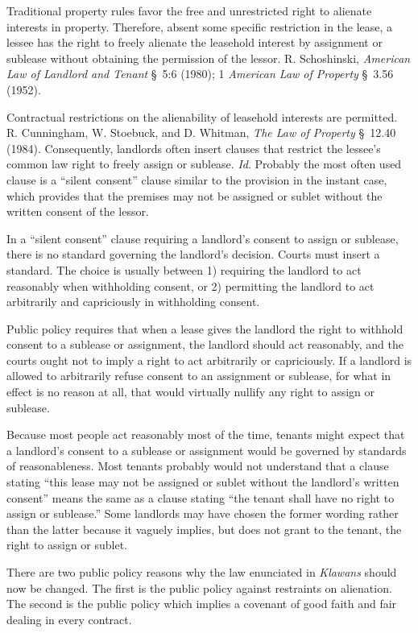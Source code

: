 Traditional property rules favor the free and unrestricted right to alienate
interests in property. Therefore, absent some specific restriction in the
lease, a lessee has the right to freely alienate the leasehold interest by
assignment or sublease without obtaining the permission of the lessor. R.
Schoshinski, \textit{American Law of Landlord and Tenant} \S~5:6 (1980); 1
\textit{American Law of Property} \S~3.56 (1952).

Contractual restrictions on the alienability of leasehold interests are
permitted. R. Cunningham, W. Stoebuck, and D. Whitman, \textit{The Law of
Property} \S~12.40 (1984). Consequently, landlords often insert clauses that
restrict the lessee's common law right to freely assign or sublease.
\textit{Id}. Probably the most often used clause is a ``silent consent'' clause
similar to the provision in the instant case, which provides that the premises
may not be assigned or sublet without the written consent of the lessor.

In a ``silent consent'' clause requiring a landlord's consent to assign or
sublease, there is no standard governing the landlord's decision. Courts must
insert a standard. The choice is usually between 1) requiring the landlord to
act reasonably when withholding consent, or 2) permitting the landlord to act
arbitrarily and capriciously in withholding consent.

Public policy requires that when a lease gives the landlord the right to
withhold consent to a sublease or assignment, the landlord should act
reasonably, and the courts ought not to imply a right to act arbitrarily or
capriciously. If a landlord is allowed to arbitrarily refuse consent to an
assignment or sublease, for what in effect is no reason at all, that would
virtually nullify any right to assign or sublease.

Because most people act reasonably most of the time, tenants might expect that a
landlord's consent to a sublease or assignment would be governed by standards
of reasonableness. Most tenants probably would not understand that a clause
stating ``this lease may not be assigned or sublet without the landlord's
written consent'' means the same as a clause stating ``the tenant shall have no
right to assign or sublease.'' Some landlords may have chosen the former
wording rather than the latter because it vaguely implies, but does not grant
to the tenant, the right to assign or sublet.

There are two public policy reasons why the law enunciated in \textit{Klawans}
should now be changed. The first is the public policy against restraints on
alienation. The second is the public policy which implies a covenant of good
faith and fair dealing in every contract.

